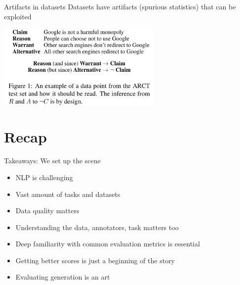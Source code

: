 \documentclass[12pt,aspectratio=169,handout]{beamer}
\begin{document}
\begin{frame}{Artifacts in datasets}
Datasets have artifacts (spurious statistics) that can be exploited

\includegraphics[width=8cm]{img/arct.png}





\end{frame}


\section*{Recap}

\begin{frame}{Takeaways: We set up the scene}
	
\begin{itemize}
	\item NLP is challenging
	\item Vast amount of tasks and datasets
	\item Data quality matters
	\item Understanding the data, annotators, task matters too
	\item Deep familiarity with common evaluation metrics is essential
	\item Getting better scores is just a beginning of the story
	\item Evaluating generation is an art
\end{itemize}
	
\end{frame}
\end{document}
